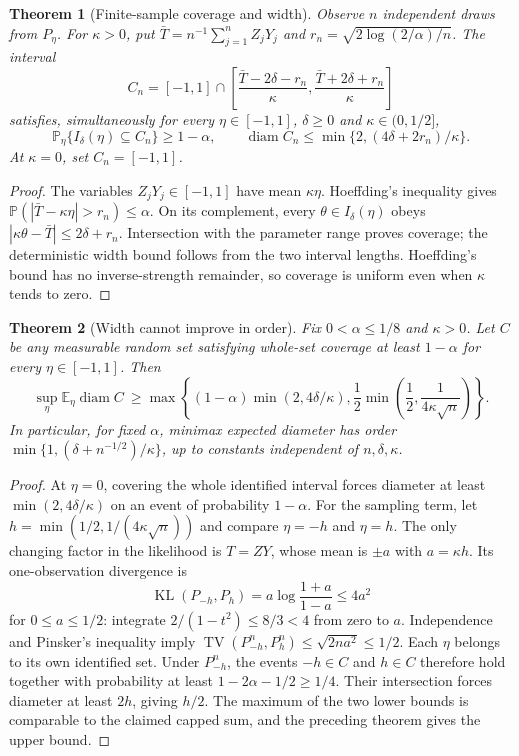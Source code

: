 \documentclass[11pt,a4paper]{article}
\newtheorem{theorem}{Theorem}
\newcommand{\E}{\mathbb E}
\newcommand{\Prb}{\mathbb P}
\newcommand{\TV}{\operatorname{TV}}
\newcommand{\KL}{\operatorname{KL}}
\newcommand{\diam}{\operatorname{diam}}
\begin{document}
\begin{theorem}[Finite-sample coverage and width]
Observe $n$ independent draws from $P_\eta$. For $\kappa>0$, put $\bar T=n^{-1}\sum_{j=1}^nZ_jY_j$ and $r_n=\sqrt{2\log(2/\alpha)/n}$. The interval
\[
 C_n=[-1,1]\cap\left[\frac{\bar T-2\delta-r_n}{\kappa},
                         \frac{\bar T+2\delta+r_n}{\kappa}\right]
\]
satisfies, simultaneously for every $\eta\in[-1,1]$, $\delta\geq0$ and $\kappa\in(0,1/2]$,
\[
 \Prb_\eta\{I_\delta(\eta)\subseteq C_n\}\geq1-\alpha,
 \qquad \diam C_n\leq\min\{2,(4\delta+2r_n)/\kappa\}.
\]
At $\kappa=0$, set $C_n=[-1,1]$.
\end{theorem}
\begin{proof}
The variables $Z_jY_j\in[-1,1]$ have mean $\kappa\eta$. Hoeffding's inequality gives $\Prb(|\bar T-\kappa\eta|>r_n)\leq\alpha$. On its complement, every $\theta\in I_\delta(\eta)$ obeys
$|\kappa\theta-\bar T|\leq2\delta+r_n$. Intersection with the parameter range proves coverage; the deterministic width bound follows from the two interval lengths. Hoeffding's bound has no inverse-strength remainder, so coverage is uniform even when $\kappa$ tends to zero.
\end{proof}

\begin{theorem}[Width cannot improve in order]
Fix $0<\alpha\leq1/8$ and $\kappa>0$. Let $C$ be any measurable random set satisfying whole-set coverage at least $1-\alpha$ for every $\eta\in[-1,1]$. Then
\[
 \sup_\eta\E_\eta\diam C\ \geq
 \max\left\{(1-\alpha)\min(2,4\delta/\kappa),
 \frac12\min\left(\frac12,\frac1{4\kappa\sqrt n}\right)\right\}.
\]
In particular, for fixed $\alpha$, minimax expected diameter has order
$\min\{1,(\delta+n^{-1/2})/\kappa\}$, up to constants independent of $n,\delta,\kappa$.
\end{theorem}
\begin{proof}
At $\eta=0$, covering the whole identified interval forces diameter at least $\min(2,4\delta/\kappa)$ on an event of probability $1-\alpha$.
For the sampling term, let $h=\min(1/2,1/(4\kappa\sqrt n))$ and compare $\eta=-h$ and $\eta=h$. The only changing factor in the likelihood is $T=ZY$, whose mean is $\pm a$ with $a=\kappa h$. Its one-observation divergence is
\[
 \KL(P_{-h},P_h)=a\log\frac{1+a}{1-a}\leq4a^2
\]
for $0\leq a\leq1/2$: integrate $2/(1-t^2)\leq 8/3<4$ from zero to $a$. Independence and Pinsker's inequality imply $\TV(P_{-h}^n,P_h^n)\leq\sqrt{2na^2}\leq1/2$.
Each $\eta$ belongs to its own identified set. Under $P_{-h}^n$, the events $-h\in C$ and $h\in C$ therefore hold together with probability at least $1-2\alpha-1/2\geq1/4$. Their intersection forces diameter at least $2h$, giving $h/2$. The maximum of the two lower bounds is comparable to the claimed capped sum, and the preceding theorem gives the upper bound.
\end{proof}
\end{document}
